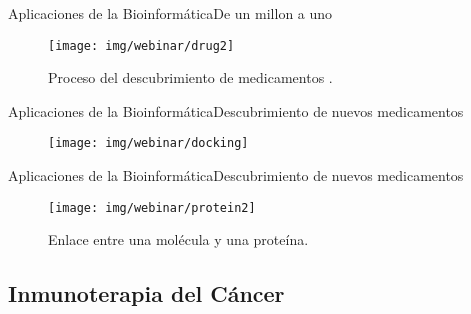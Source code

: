 \documentclass[10pt]{beamer}
\newcommand{\1}{
        	\setbeamertemplate{background}{
        		\texttt{[image: img/1]}
        		\tikz[overlay] \fill[fill opacity=0.75,fill=white] (0,0) rectangle (-\paperwidth,\paperheight);
        	}
}
\begin{document}
\begin{frame}{Aplicaciones de la Bioinformática}{De un millon a uno}
	\begin{figure}[]
		\centering
		\texttt{[image: img/webinar/drug2]}
		\caption{Proceso del descubrimiento de medicamentos \cite{chanin2020}.}
	\end{figure}
\end{frame}

\begin{frame}{Aplicaciones de la Bioinformática}{Descubrimiento de nuevos medicamentos}
	\begin{figure}[]
		\centering
		\texttt{[image: img/webinar/docking]}		
	\end{figure}
\end{frame}

\begin{frame}{Aplicaciones de la Bioinformática}{Descubrimiento de nuevos medicamentos}
	\begin{figure}[]
		\centering
		\texttt{[image: img/webinar/protein2]}
		\caption{Enlace entre una molécula y una proteína.}
	\end{figure}
\end{frame}


\subsection{Inmunoterapia del Cáncer}
\end{document}
